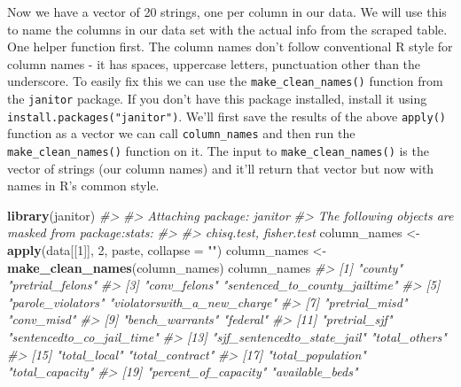 \documentclass[
  12pt,
]{book}
\newenvironment{Shaded}{\begin{snugshade}}{\end{snugshade}}
\newcommand{\CommentTok}[1]{\textcolor[rgb]{0.56,0.35,0.01}{\textit{#1}}}
\newcommand{\DataTypeTok}[1]{\textcolor[rgb]{0.13,0.29,0.53}{#1}}
\newcommand{\DecValTok}[1]{\textcolor[rgb]{0.00,0.00,0.81}{#1}}
\newcommand{\KeywordTok}[1]{\textcolor[rgb]{0.13,0.29,0.53}{\textbf{#1}}}
\newcommand{\NormalTok}[1]{#1}
\newcommand{\StringTok}[1]{\textcolor[rgb]{0.31,0.60,0.02}{#1}}
\begin{document}
Now we have a vector of 20 strings, one per column in our data. We will use this to name the columns in our data set with the actual info from the scraped table. One helper function first. The column names don't follow conventional R style for column names - it has spaces, uppercase letters, punctuation other than the underscore. To easily fix this we can use the \texttt{make\_clean\_names()} function from the \texttt{janitor} package. If you don't have this package installed, install it using \texttt{install.packages("janitor")}. We'll first save the results of the above \texttt{apply()} function as a vector we can call \texttt{column\_names} and then run the \texttt{make\_clean\_names()} function on it. The input to \texttt{make\_clean\_names()} is the vector of strings (our column names) and it'll return that vector but now with names in R's common style.

\begin{Shaded}
\begin{Highlighting}[]
\KeywordTok{library}\NormalTok{(janitor)}
\CommentTok{\#> }
\CommentTok{\#> Attaching package: \textquotesingle{}janitor\textquotesingle{}}
\CommentTok{\#> The following objects are masked from \textquotesingle{}package:stats\textquotesingle{}:}
\CommentTok{\#> }
\CommentTok{\#>     chisq.test, fisher.test}
\NormalTok{column\_names <{-}}\StringTok{ }\KeywordTok{apply}\NormalTok{(data[[}\DecValTok{1}\NormalTok{]], }\DecValTok{2}\NormalTok{, paste, }\DataTypeTok{collapse =} \StringTok{""}\NormalTok{)}
\NormalTok{column\_names <{-}}\StringTok{ }\KeywordTok{make\_clean\_names}\NormalTok{(column\_names)}
\NormalTok{column\_names}
\CommentTok{\#>  [1] "county"                       "pretrial\_felons"             }
\CommentTok{\#>  [3] "conv\_felons"                  "sentenced\_to\_county\_jailtime"}
\CommentTok{\#>  [5] "parole\_violators"             "violatorswith\_a\_new\_charge"  }
\CommentTok{\#>  [7] "pretrial\_misd"                "conv\_misd"                   }
\CommentTok{\#>  [9] "bench\_warrants"               "federal"                     }
\CommentTok{\#> [11] "pretrial\_sjf"                 "sentencedto\_co\_jail\_time"    }
\CommentTok{\#> [13] "sjf\_sentencedto\_state\_jail"   "total\_others"                }
\CommentTok{\#> [15] "total\_local"                  "total\_contract"              }
\CommentTok{\#> [17] "total\_population"             "total\_capacity"              }
\CommentTok{\#> [19] "percent\_of\_capacity"          "available\_beds"}
\end{Highlighting}
\end{Shaded}
\end{document}
